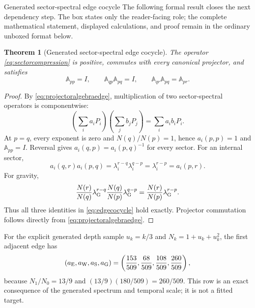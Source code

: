 \documentclass[11pt]{article}
\numberwithin{equation}{section}
\newtheorem{theorem}[definition]{Theorem}
\theoremstyle{remark}
\begin{document}
\begin{proofguide}{Generated sector-spectral edge cocycle}
The following formal result closes the next dependency step. The box states only the reader-facing role; the complete mathematical statement, displayed calculations, and proof remain in the ordinary unboxed format below.
\end{proofguide}
\begin{theorem}[Generated sector-spectral edge cocycle]
The operator \eqref{eq:sectorcompression} is positive, commutes with every canonical projector, and satisfies
\begin{equation}
\mathbb A_{pp}=I,
\qquad
\mathbb A_{qp}\mathbb A_{pq}=I,
\qquad
\mathbb A_{qr}\mathbb A_{pq}=\mathbb A_{pr}.
\label{eq:edgecocycle}
\end{equation}
\end{theorem}
\begin{proof}
By \eqref{eq:projectoralgebraedge}, multiplication of two sector-spectral operators is componentwise:
\begin{equation}
\left(\sum_i a_iP_i\right)\left(\sum_jb_jP_j\right)=\sum_i a_ib_iP_i.
\end{equation}
At $p=q$, every exponent is zero and $N(q)/N(p)=1$, hence $a_i(p,p)=1$ and $\mathbb A_{pp}=I$.  Reversal gives $a_i(q,p)=a_i(p,q)^{-1}$ for every sector.  For an internal sector,
\begin{equation}
a_i(q,r)a_i(p,q)=\lambda_i^{r-q}\lambda_i^{q-p}=\lambda_i^{r-p}=a_i(p,r).
\end{equation}
For gravity,
\begin{equation}
\frac{N(r)}{N(q)}\lambda_{\rm G}^{r-q}
\frac{N(q)}{N(p)}\lambda_{\rm G}^{q-p}
=\frac{N(r)}{N(p)}\lambda_{\rm G}^{r-p}.
\end{equation}
Thus all three identities in \eqref{eq:edgecocycle} hold exactly.  Projector commutation follows directly from \eqref{eq:projectoralgebraedge}.
\end{proof}

For the explicit generated depth sample $u_k=k/3$ and $N_k=1+u_k+u_k^2$, the first adjacent edge has
\begin{equation}
(a_{\rm E},a_{\rm W},a_{\rm S},a_{\rm G})
=\left(\frac{153}{509},\frac{68}{509},\frac{108}{509},\frac{260}{509}\right),
\end{equation}
because $N_1/N_0=13/9$ and $(13/9)(180/509)=260/509$.  This row is an exact consequence of the generated spectrum and temporal scale; it is not a fitted target.
\end{document}
